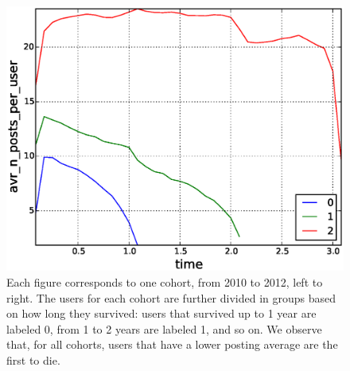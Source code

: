 \begin{figure}[!tb]
\includegraphics[scale=0.25]{./images/avr_posts_per_user_for_surviving_year_for_2012.eps}
\caption{Each figure corresponds to one cohort, from 2010 to 2012, left to right. The users for each cohort are further divided in groups based on how long they survived: users that survived up to 1 year are labeled 0, from 1 to 2 years are labeled 1, and so on. We observe that, for all cohorts, users that have a lower posting average are the first to die.}
\label{fig:avr_posts_per_user_for_surviving_year}
\end{figure}


